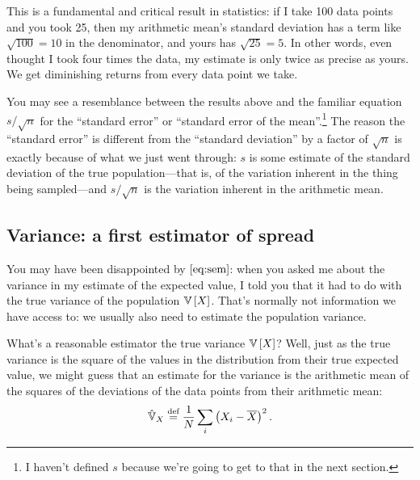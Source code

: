 This is a fundamental and critical result in statistics: if I take 100 data
points and you took 25, then my arithmetic mean's standard deviation has a
term like $\sqrt{100} = 10$ in the denominator, and yours has $\sqrt{25} = 5$.
In other words, even thought I took four times the data, my estimate is only
twice as precise as yours. We get diminishing returns from every data point
we take.

You may see a resemblance between the results above and the familiar equation
$s/\sqrt{n}$ for the ``standard error'' or ``standard error of the
mean''.\footnote{I haven't defined $s$ because we're going to get to that in
the next section.} The reason the ``standard error'' is different from the
``standard deviation'' by a factor of $\sqrt{n}$ is exactly because of what we
just went through: $s$ is some estimate of the standard deviation of the true
population---that is, of the variation inherent in the thing being
sampled---and $s/\sqrt{n}$ is the variation inherent in the arithmetic mean.

\subsection{Variance: a first estimator of spread}

You may have been disappointed by $\eqref{eq:sem}$: when you asked me about
the variance in my estimate of the expected value, I told you that it had to
do with the true variance of the population $\mathbb{V}\left[{X}\right]$. That's normally not
information we have access to: we usually also need to estimate the population
variance.

What's a reasonable estimator the true variance $\mathbb{V}\left[{X}\right]$? Well, just as the
true variance is the square of the values in the distribution from their true
expected value, we might guess that an estimate for the variance is the
arithmetic mean of the squares of the deviations of the data points from their
arithmetic mean:
\begin{equation}\label{eq:estimator-vx1}
\hat{\mathbb{V}}_X \stackrel{\text{def}}{=} \frac{1}{N} \sum_i \left( X_i - \overline{X} \right)^2.
\end{equation}

